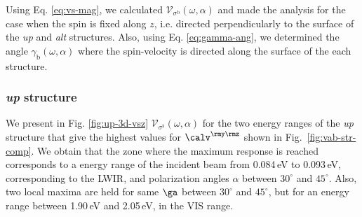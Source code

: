\documentclass[prb,11pt,tightenlines,twocolumn,aps]{revtex4-1}
\begin{document}
Using Eq. \eqref{eq:vs-mag}, we calculated 
$\mathcal{V}_{\sigma^{\mathrm{b}}}(\omega,\alpha)$ 
and made the analysis for the case when the spin is fixed
along $z$, i.e. directed perpendicularly to the surface of the \emph{up} and
\emph{alt} structures. Also, using Eq. \eqref{eq:gamma-ang}, we determined the
angle $\gamma_{\mathrm{b}}(\omega,\alpha)$ where the spin-velocity is directed
along the surface of the each structure.
% 

\subsubsection{{\it up} structure}\label{up:fs}

We present in Fig. \ref{fig:up-3d-vsz} 
$\mathcal{V}_{\sigma^{\mathrm{z}}} (\omega,\alpha)$
for the two energy ranges of the \emph{up} structure that give the
highest values for $\calv^{\rmy\rmz}$ shown in Fig.~\ref{fig:vab-str-comp}.
% 
We obtain that the zone where the maximum response is reached corresponds to
a energy range of the incident beam from 0.084\,eV to 0.093\,eV, 
corresponding to the LWIR,
and polarization angles $\alpha$ 
between $30^{\circ}$ and $45^{\circ}$. 
Also,  two local maxima are held for same 
$\ga$ between $30^{\circ}$ and $45^{\circ}$, 
but for an energy range between 1.90\,eV and 2.05\,eV, in the VIS
range.
\end{document}
